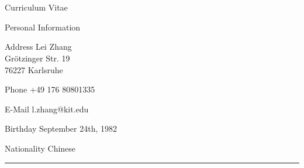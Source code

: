 \cleardoublepage
\section*{}
\pagestyle{plain}
\vspace{-1cm}
\setlength{\cvlabelwidth}{40mm} 

\sffamily

\begin{cv}{\centerline{\LARGE Curriculum Vitae}}
  \vspace{0.5cm}
  \begin{cvlist}{Personal Information}
  \item[Address] Lei Zhang \\
    Grötzinger Str. 19\\
    76227 Karlsruhe
  \item[Phone] +49 176 80801335
  \item[E-Mail] l.zhang@kit.edu
  \item[Birthday] September 24th, 1982
  \item[Nationality] Chinese
  \end{cvlist}

  \hrule


\end{cv}
